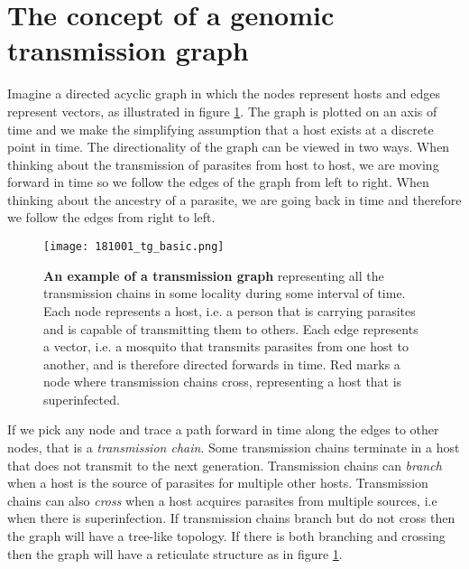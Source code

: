 \documentclass[_main.tex]{subfiles}
\begin{document}

\section*{The concept of a genomic transmission graph}

Imagine a directed acyclic graph in which the nodes represent hosts and edges represent vectors, as illustrated in figure \ref{fig:main_graph_1}.  The graph is plotted on an axis of time and we make the simplifying assumption that a host exists at a discrete point in time.  The directionality of the graph can be viewed in two ways.  When thinking about the transmission of parasites from host to host, we are moving forward in time so we follow the edges of the graph from left to right.  When thinking about the ancestry of a parasite, we are going back in time and therefore we follow the edges from right to left. 


\begin{figure}[h!]
\centering
\texttt{[image: 181001\_tg\_basic.png]}
\caption{\textbf{An example of a transmission graph} representing all the transmission chains in some locality during some interval of time. Each node represents a host, i.e. a person that is carrying parasites and is capable of transmitting them to others.  Each edge represents a vector, i.e. a mosquito that transmits parasites from one host to another, and is therefore directed forwards in time. Red marks a node where transmission chains cross, representing a host that is superinfected.}
\label{fig:main_graph_1}
\end{figure}

If we pick any node and trace a path forward in time along the edges to other nodes, that is a \textit{transmission chain}. Some transmission chains terminate in a host that does not transmit to the next generation. Transmission chains can \textit{branch} when a host is the source of parasites for multiple other hosts.  Transmission chains can also \textit{cross} when a host acquires parasites from multiple sources, i.e when there is superinfection.   If transmission chains branch but do not cross then the graph will have a tree-like topology.  If there is both branching and crossing then the graph will have a reticulate structure as in figure \ref{fig:main_graph_1}.
\end{document}
